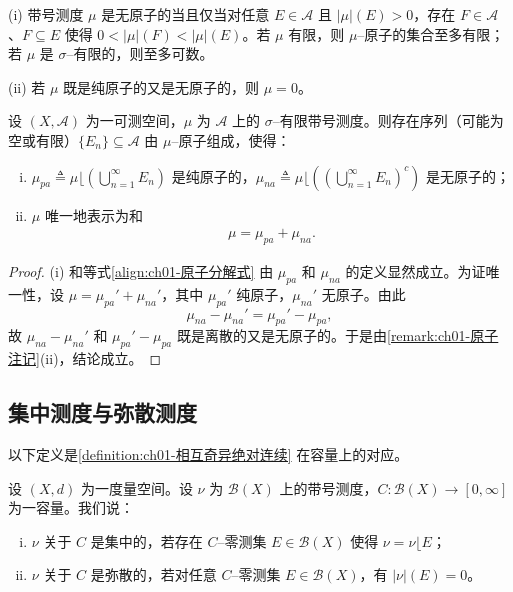 \documentclass[../../main.tex]{subfiles}%
\begin{document}
\begin{remark}\label{remark:ch01-原子注记}
(i) 带号测度 $\mu$ 是无原子的当且仅当对任意 $E\in\mathcal{A}$ 且 $|\mu|(E)>0$，存在 $F\in\mathcal{A}$、$F\subseteq E$ 使得 $0<|\mu|(F)<|\mu|(E)$。若 $\mu$ 有限，则 $\mu$--原子的集合至多有限；若 $\mu$ 是 $\sigma$--有限的，则至多可数。

(ii) 若 $\mu$ 既是纯原子的又是无原子的，则 $\mu=0$。
\end{remark}

\begin{proposition}\label{proposition:ch01-原子分解}
设 $(X,\mathcal{A})$ 为一可测空间，$\mu$ 为 $\mathcal{A}$ 上的 $\sigma$--有限带号测度。则存在序列（可能为空或有限）$\{E_n\}\subseteq\mathcal{A}$ 由 $\mu$--原子组成，使得：
\begin{enumerate}[(i)]
\item $\mu_{pa}\triangleq \mu\lfloor\left(\bigcup_{n=1}^\infty E_n\right)$ 是纯原子的，$\mu_{na}\triangleq \mu\lfloor\left(\left(\bigcup_{n=1}^\infty E_n\right)^c\right)$ 是无原子的；
\item $\mu$ 唯一地表示为和
\begin{align}
\mu=\mu_{pa}+\mu_{na}. \label{align:ch01-原子分解式}
\end{align}
\end{enumerate}
\end{proposition}

\begin{proof}
(i) 和等式\eqref{align:ch01-原子分解式} 由 $\mu_{pa}$ 和 $\mu_{na}$ 的定义显然成立。为证唯一性，设 $\mu=\mu_{pa}'+\mu_{na}'$，其中 $\mu_{pa}'$ 纯原子，$\mu_{na}'$ 无原子。由此
\[
\mu_{na}-\mu_{na}'=\mu_{pa}'-\mu_{pa},
\]
故 $\mu_{na}-\mu_{na}'$ 和 $\mu_{pa}'-\mu_{pa}$ 既是离散的又是无原子的。于是由\cref{remark:ch01-原子注记}(ii)，结论成立。
\end{proof}

\subsection{集中测度与弥散测度}\label{subsection:ch01-集中弥散}

以下定义是\cref{definition:ch01-相互奇异绝对连续} 在容量上的对应。

\begin{definition}\label{definition:ch01-集中弥散}
设 $(X,d)$ 为一度量空间。设 $\nu$ 为 $\mathcal{B}(X)$ 上的带号测度，$C:\mathcal{B}(X)\to[0,\infty]$ 为一容量。我们说：
\begin{enumerate}[(i)]
\item $\nu$ 关于 $C$ 是集中的，若存在 $C$--零测集 $E\in\mathcal{B}(X)$ 使得 $\nu=\nu\lfloor E$；
\item $\nu$ 关于 $C$ 是弥散的，若对任意 $C$--零测集 $E\in\mathcal{B}(X)$，有 $|\nu|(E)=0$。
\end{enumerate}
\end{definition}
\end{document}
